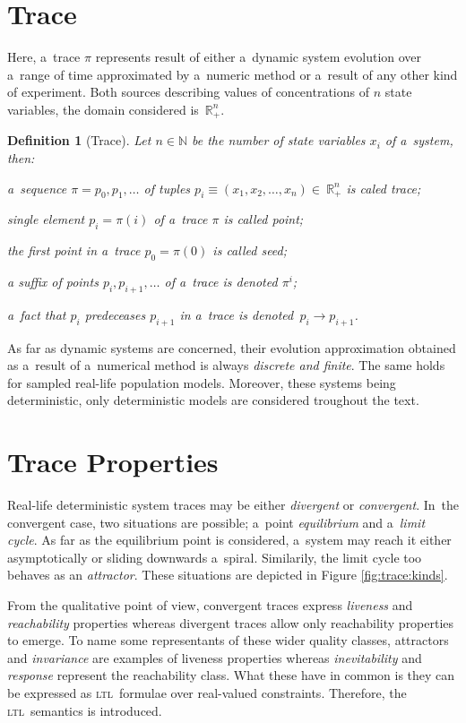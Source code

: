 \documentclass[12pt,oneside,draft]{fithesis}
\newcommand{\ltl}{\textsc{ltl}~}
\newcommand{\mReal}{\mathbb{R}}
\newcommand{\mNatural}{\mathbb{N}}
\newtheorem{mydef}{Definition}
\begin{document}
\section{Trace}
Here, a~trace $\pi$ represents result of either a~dynamic system
evolution over a~range of time\cite{sven,pospisil} approximated by
a~numeric method or a~result of any other kind of experiment.
Both sources describing values of concentrations of $n$ state variables,
the domain considered is~$\mReal_{+}^n$.

\begin{mydef}[Trace]
Let $n\in\mNatural$ be the number of state variables $x_i$ of a~system,
then:
\begin{inparaenum}
\item a~sequence $\pi=p_0,p_1,\dotsc$ of tuples
$p_i\equiv(x_1,x_2,\dotsc,x_n)\in~\mReal_{+}^n$ is caled trace;
\item single element $p_i=\pi(i)$ of a~trace $\pi$ is called point;
\item the first point in a~trace $p_0=\pi(0)$ is called seed;
\item a suffix of points $p_i,p_{i+1},\dotsc$ of a~trace is
denoted $\pi^i$;
\item a~fact that $p_i$ predeceases $p_{i+1}$ in a~trace is
denoted~$p_i\rightarrow p_{i+1}$.
\end{inparaenum}
\end{mydef}

As far as dynamic systems are concerned, their evolution approximation
obtained as a~result of a~numerical method is always \emph{discrete and
finite}. The same holds for sampled real-life population models.
Moreover, these systems being deterministic\cite{sven}, only
deterministic models are considered troughout the text.

\section{Trace Properties}
Real-life deterministic system traces may be either \emph{divergent} or
\emph{convergent}. In~the convergent case, two situations are possible;
a~point \emph{equilibrium} and a~\emph{limit cycle}. As far as the
equilibrium point is considered, a~system may reach it either
asymptotically or sliding downwards a~spiral. Similarily, the limit
cycle too behaves as an \emph{attractor}. These situations are depicted
in Figure \ref{fig:trace:kinds}.

From the qualitative point of view, convergent traces express
\emph{liveness} and \emph{reachability} properties whereas
divergent traces allow only reachability properties to emerge.
To name some representants of these wider quality classes,
attractors and  \emph{invariance} are examples of liveness
properties whereas \emph{inevitability} and \emph{response} represent
the reachability class\cite{rizk}. What these have in common is they
can be expressed as \ltl formulae over real-valued
constraints\cite{sven}. Therefore, the \ltl semantics is introduced.
\end{document}
